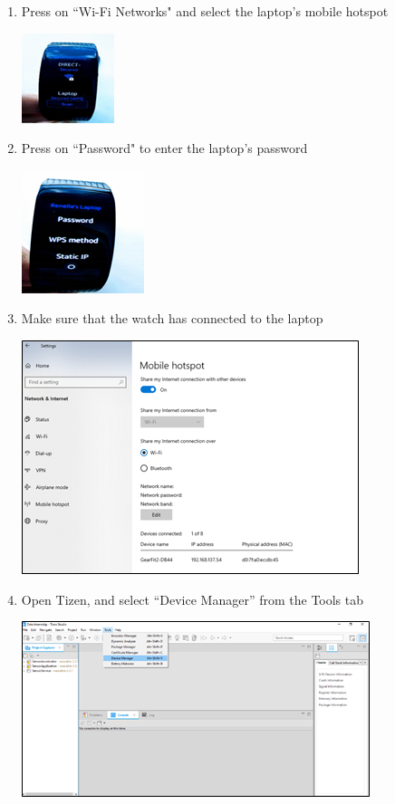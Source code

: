 \documentclass[12pt, a4paper]{article}
\begin{document}
\begin{enumerate}
\begin{center}
\end{center}
  \item Press on ``Wi-Fi Networks" and select the laptop's mobile hotspot
      \begin{center}
    \includegraphics[width=.3\textwidth]{Pic 12.png}
\end{center}
  \item Press on ``Password" to enter the laptop's password
      \begin{center}
    \includegraphics[width=.3\textwidth]{Pic 13.png}
\end{center}
\cleardoublepage
  \item Make sure that the watch has connected to the laptop
      \begin{center}
    \includegraphics[width=.6\textwidth]{Pic 14.2.png}
\end{center}
  \item Open Tizen, and select “Device Manager” from the Tools tab 
      \begin{center}
    \includegraphics[width=.7\textwidth]{Pic 15.2.png}

\end{center}
\end{enumerate}
\end{document}
